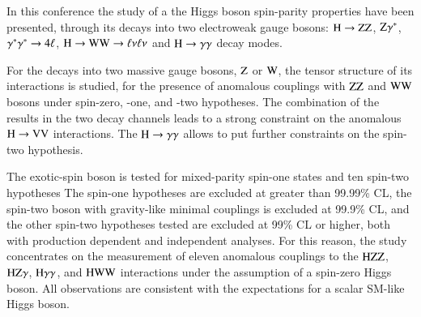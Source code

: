 In this conference the study of a the Higgs boson spin-parity
properties have been presented, through its decays into two
electroweak gauge bosons: $\mathrm{H}\to\mathrm{Z}\mathrm{Z}$, $\mathrm{Z} \gamma^*$,
$\gamma^*\gamma^*\to4\ell$, $\mathrm{H}\to\mathrm{W}\mathrm{W}\to\ell\nu\ell\nu$ and
$\mathrm{H}\to\gamma\gamma$ decay modes.

For the decays into two massive gauge bosons, $\mathrm{Z}$ or $\mathrm{W}$, the
tensor structure of its interactions is studied, for the presence of
anomalous couplings with $\mathrm{Z}\mathrm{Z}$ and $\mathrm{W}\mathrm{W}$ bosons under spin-zero,
-one, and -two hypotheses. The combination of the results in the two
decay channels leads to a strong constraint on the anomalous
$\mathrm{H}\to\mathrm{V}\mathrm{V}$ interactions. The $\mathrm{H}\to\gamma\gamma$ allows to put further
constraints on the spin-two hypothesis.

The exotic-spin boson is tested for mixed-parity spin-one states and
ten spin-two hypotheses The spin-one hypotheses are excluded at
greater than 99.99\% CL, the spin-two boson with gravity-like minimal
couplings is excluded at 99.9\% CL, and the other spin-two hypotheses
tested are excluded at 99\% CL or higher, both with production
dependent and independent analyses. 
%
For this reason, the study concentrates on the measurement of eleven
anomalous couplings to the $\mathrm{H}\mathrm{Z}\mathrm{Z}$, $\mathrm{H}\mathrm{Z}\gamma$,
$\mathrm{H}\gamma\gamma$, and $\mathrm{H}\mathrm{W}\mathrm{W}$ interactions under the assumption of
a spin-zero Higgs boson. All observations are consistent with the
expectations for a scalar SM-like Higgs boson.

